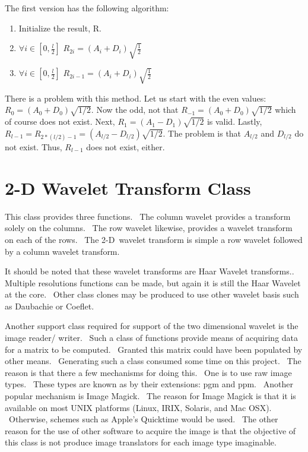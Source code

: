 The first version has the following algorithm:

\begin{enumerate}
\item Initialize the result, R.
\item $\forall i \in [0,\frac{l}{2}]$
	$R_{2i} = (A_i + D_i) \sqrt{ \frac{1}{2}}$
\item $\forall i \in [0,\frac{l}{2}]$
	$R_{2i-1} = (A_i + D_i) \sqrt {\frac{1}{2}} $
\end{enumerate}

There is a problem with this method.  Let us start with the even values:   $R_0 = (A_0 + D_0 )\sqrt{1/2}$.   Now the odd, not that $R_{-1}=(A_0 + D_0)\sqrt{1/2}$ which of course does not exist.  Next, $R_1 = (A_1 - D_1)\sqrt{1/2}$ is valid.   Lastly, $R_{l-1}=R_{2*(l/2) - 1} = (A_{l/2} - D_{l/2})\sqrt{1/2}$.  The problem is that $A_{l/2}$ and $D_{l/2}$ do not exist.  Thus, $R_{l-1}$ does not exist, either.  

\bigskip

\section {2-D Wavelet Transform Class}
This class provides three functions. \ The column wavelet provides a
transform solely on the columns. \ The row wavelet likewise, provides a
wavelet transform on each of the rows. \ The 2-D\ wavelet transform is
simple a row wavelet followed by a column wavelet transform. \ 

It should be noted that these wavelet transforms are Haar Wavelet
transforms.. Multiple resolutions functions can be made, but again it is
still the Haar Wavelet at the core. \ Other class clones may be produced to
use other wavelet basis such as Daubachie or Coeflet. \ 

Another support class required for support of the two dimensional wavelet is
the image reader/ writer. \ Such a class of functions provide means of
acquiring data for a matrix to be computed. \ Granted this matrix could have
been populated by other means. \ Generating such a class consumed some time
on this project. \ The reason is that there a few mechanisms for doing this.
\ One is to use raw image types. \ These types are known as by their
extensions: pgm and ppm. \ Another popular mechanism is Image Magick. \ The
reason for Image Magick is that it is available on most UNIX platforms
(Linux, IRIX, Solaris, and Mac OSX). \ Otherwise, schemes such as Apple's
Quicktime would be used. \ The other reason for the use of other software to
acquire the image is that the objective of this class is not produce image
translators for each image type imaginable. \ 

